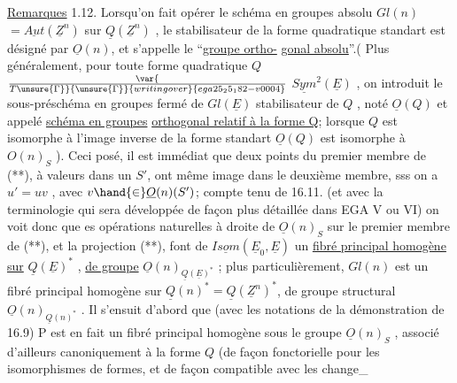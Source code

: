 \uline{Remarques} 1.12. Lorsqu'on fait opérer le schéma en groupes absolu
$Gl(n)$  $= \underline{Aut}(\underline{Z}^n )$ sur $\underline{Q}(\underline{Z}^n)$ , le stabilisateur de la forme
quadratique standart est désigné par $\underline{O}(n)$, et s'appelle le ``\uline{groupe ortho-}%
\uline{gonal absolu}''.( Plus généralement, pour toute forme quadratique $Q$ \hand{$\in$}
$\var{\over{T}{\unsure{\Gamma}}}{\unsure{\Gamma}}{writing over}{ega25_25_182-v0004}$ $\underline{Sym}^2(\underline{E})$ , on introduit le sous-préschéma en groupes fermé de
$Gl(\underline{E})$  stabilisateur de $Q$ , noté $\underline{O}(Q)$ et appelé \uline{schéma en groupes}
\uline{orthogonal relatif à la forme Q}; lorsque $Q$ est isomorphe à l'image
inverse de la forme standart \hand{,} $\underline{O}(Q)$ est isomorphe à $O(n)_S$ ). Ceci posé,
il est immédiat que deux points  du premier membre de (**), à valeurs dans
un $S'$, ont même image dans le deuxième membre, sss 
 on a $u' = uv$ , avec $v \hand{\in} \underline{O}(n)(S')$; compte tenu de 16.11. (et
avec la terminologie qui sera développée de façon plus détaillée dans
EGA V ou VI) on voit donc que es opérations naturelles à droite de
$\underline{O}(n)_S$ sur le premier membre de (**), et la projection (**), font de
$\underline{Isom}(\underline{E}_0,\underline{E})$ un \uline{fibré principal homogène sur} $\underline{Q}(\underline{E})^*$ , \uline{de groupe} $\underline{O}(n)_{\underline{Q}(\underline{E})^*}$ ;
plus particulièrement,  $Gl(n)$ est un fibré principal
homogène sur $\underline{Q}(n)^* = \underline{Q}(\underline{Z}^n)^*$, de groupe structural $\underline{O}(n)_{\underline{Q}(n)^*}$ . Il
s'ensuit  d'abord que (avec les notations de la démonstration de 16.9)
P est en fait un fibré principal homogène sous le groupe $\underline{O}(n)_S$ , associé
 d'ailleurs canoniquement à la forme $Q$ (de façon fonctorielle
pour les isomorphismes de formes, et de façon compatible avec les change\_%

